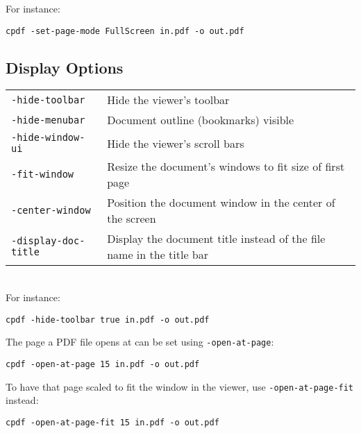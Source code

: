 \documentclass{book}
\begin{document}
  \noindent For instance:
  \begin{framed}
    \small\verb!cpdf -set-page-mode FullScreen in.pdf -o out.pdf!
  \end{framed}
  
  \subsection{Display Options}
\vspace{2mm}
  {\small\begin{tabular}{ll}
    \texttt{-hide-toolbar} & \vspace{2mm} \parbox{8cm}{Hide the viewer's toolbar} \\
    \texttt{-hide-menubar} & \vspace{2mm} \parbox{8cm}{Document outline (bookmarks) visible} \\
    \texttt{-hide-window-ui} & \vspace{2mm} \parbox{8cm}{Hide the viewer's scroll bars} \\
    \texttt{-fit-window} & \vspace{2mm} \parbox{8cm}{Resize the document's windows to fit size of first page} \\
    \texttt{-center-window} & \vspace{2mm} \parbox{8cm}{Position the document window in the center of the screen} \\
    \texttt{-display-doc-title} & \vspace{2mm} \parbox{8cm}{Display the document title instead of the file name in the title bar}
  \end{tabular}}\\

  \noindent For instance:
  \begin{framed}
    \small\verb!cpdf -hide-toolbar true in.pdf -o out.pdf!
  \end{framed}

The page a PDF file opens at can be set using \texttt{-open-at-page}:
  \begin{framed}
    \small\verb!cpdf -open-at-page 15 in.pdf -o out.pdf!
  \end{framed}

To have that page scaled to fit the window in the viewer, use \texttt{-open-at-page-fit} instead:
  \begin{framed}
    \small\verb!cpdf -open-at-page-fit 15 in.pdf -o out.pdf!
  \end{framed}
\end{document}
